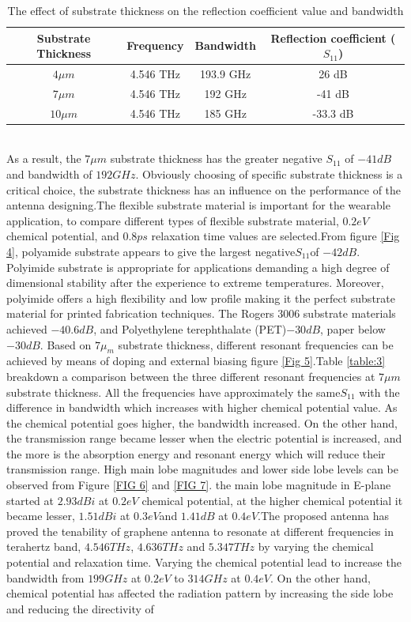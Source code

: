 \documentclass[12pt]{suhbook}
\begin{document}
\begin{table}[hbt!]
\centering
 \begin{tabular}{||c c c c||} 
 \hline
Substrate Thickness & Frequency & Bandwidth & Reflection coefficient ($S_{11}$) \\ [0.5ex] 
 \hline\hline
$ 4 \mu m$ & 4.546 THz & 193.9 GHz & 26 dB \\ 
 \hline
$ 7 \mu m$ & 4.546 THz & 192 GHz & -41 dB  \\
 \hline
 $10 \mu m$ & 4.546 THz & 185 GHz & -33.3 dB \\[1ex] 
 \hline
\end{tabular}
\caption{The effect of substrate thickness on the reflection coefficient value and bandwidth }
\label{table:2}
\end{table}
\\As a result, the $7 \mu m$ substrate thickness has the greater negative $S_{11}$ of $-41 dB$ and bandwidth of $192 GHz$. Obviously choosing of specific substrate thickness is a critical choice, the substrate thickness has an influence on the performance of the antenna designing.The flexible substrate material is important for the wearable application, to compare different types of flexible substrate material, $0.2 eV$ chemical potential, and $0.8 ps$ relaxation time values are selected.From figure \ref{Fig 4}, polyamide substrate appears to give the largest negative$S_{11}$of $-42 dB$. Polyimide substrate is appropriate for applications demanding a high degree of dimensional stability after the experience to extreme temperatures. Moreover, polyimide offers a high flexibility and low profile making it the perfect substrate material for printed fabrication techniques. The Rogers $3006$ substrate materials achieved $-40.6 dB$, and Polyethylene terephthalate (PET)$-30dB$, paper below $-30dB$. Based on $7  \mu_m$  substrate thickness, different resonant frequencies can be achieved by means of doping and external biasing figure \ref{Fig 5}.Table \ref{table:3} breakdown a comparison between the three different resonant frequencies at $7 \mu m$ substrate thickness. All the frequencies have approximately the same$S_{11}$ with the difference in bandwidth which increases with higher chemical potential value. As the chemical potential goes higher, the bandwidth increased. On the other hand, the transmission range became lesser when the electric potential is increased, and the more is the absorption energy and resonant energy which will reduce their transmission range. High main lobe magnitudes and lower side lobe levels can be observed from Figure \ref{FIG 6} and \ref{FIG 7}. the main lobe magnitude in E-plane started at $2.93 dBi$ at $0.2 eV$ chemical potential, at the higher chemical potential it became lesser, $1.51 dBi $ at $0.3 eV $and $1.41 dB$ at $0.4 eV$.The proposed antenna has proved the tenability of graphene antenna to resonate at different frequencies in terahertz band, $4.546 THz$, $4.636 THz$ and $5.347 THz$ by varying the chemical potential and relaxation time. Varying the chemical potential lead to increase the bandwidth from $199 GHz$ at $0.2 eV$ to $314 GHz$ at $0.4 eV$. On the other hand, chemical potential has affected the radiation pattern by increasing the side lobe and reducing the directivity of 
\end{document}
